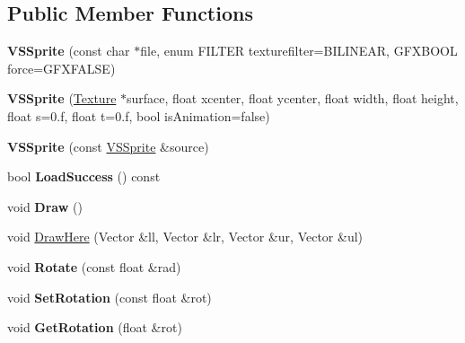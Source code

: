 \subsection*{Public Member Functions}
\begin{DoxyCompactItemize}
\item 
{\bfseries V\+S\+Sprite} (const char $\ast$file, enum F\+I\+L\+T\+ER texturefilter=B\+I\+L\+I\+N\+E\+AR, G\+F\+X\+B\+O\+OL force=G\+F\+X\+F\+A\+L\+SE)\hypertarget{classVSSprite_a52af76266fd28fb523d24db7ee26349c}{}\label{classVSSprite_a52af76266fd28fb523d24db7ee26349c}

\item 
{\bfseries V\+S\+Sprite} (\hyperlink{classTexture}{Texture} $\ast$surface, float xcenter, float ycenter, float width, float height, float s=0.f, float t=0.f, bool is\+Animation=false)\hypertarget{classVSSprite_a99464729e5f5189cc3a1f2aab58364a3}{}\label{classVSSprite_a99464729e5f5189cc3a1f2aab58364a3}

\item 
{\bfseries V\+S\+Sprite} (const \hyperlink{classVSSprite}{V\+S\+Sprite} \&source)\hypertarget{classVSSprite_a32eeec96e6136e96d2c83491bed287e1}{}\label{classVSSprite_a32eeec96e6136e96d2c83491bed287e1}

\item 
bool {\bfseries Load\+Success} () const \hypertarget{classVSSprite_aca82a99261ffb505faa983d07409e3fc}{}\label{classVSSprite_aca82a99261ffb505faa983d07409e3fc}

\item 
void {\bfseries Draw} ()\hypertarget{classVSSprite_a4b12c738d5ff8982d612edaf315ab072}{}\label{classVSSprite_a4b12c738d5ff8982d612edaf315ab072}

\item 
void \hyperlink{classVSSprite_a4cdf17d722cb0e526e559bc3e15ea6e7}{Draw\+Here} (Vector \&ll, Vector \&lr, Vector \&ur, Vector \&ul)
\item 
void {\bfseries Rotate} (const float \&rad)\hypertarget{classVSSprite_a4d0783845d898900d7d18f264bf48686}{}\label{classVSSprite_a4d0783845d898900d7d18f264bf48686}

\item 
void {\bfseries Set\+Rotation} (const float \&rot)\hypertarget{classVSSprite_af73820325c8a676de082ef0a245d1bd4}{}\label{classVSSprite_af73820325c8a676de082ef0a245d1bd4}

\item 
void {\bfseries Get\+Rotation} (float \&rot)\hypertarget{classVSSprite_a4631ff7d0f8b64b8885fdb9a71d084a8}{}\label{classVSSprite_a4631ff7d0f8b64b8885fdb9a71d084a8}


\end{DoxyCompactItemize}
